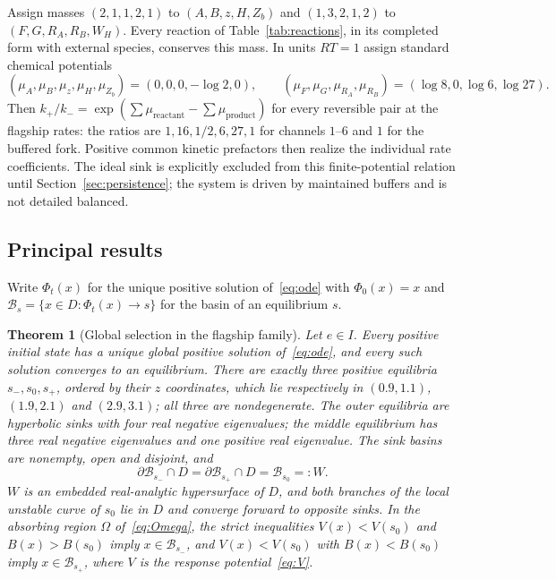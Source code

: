 \documentclass[11pt,a4paper]{article}
\theoremstyle{plain}
\newtheorem{theorem}{Theorem}[section]
\theoremstyle{definition}
\theoremstyle{remark}
\newcommand{\B}{\mathcal{B}}
\begin{document}
Assign masses $(2,1,1,2,1)$ to $(A,B,z,H,Z_b)$ and $(1,3,2,1,2)$ to $(F,G,R_A,R_B,W_H)$. Every reaction of Table~\ref{tab:reactions}, in its completed form with external species, conserves this mass. In units $RT=1$ assign standard chemical potentials
\begin{equation}\label{eq:mu}
(\mu_A,\mu_B,\mu_z,\mu_H,\mu_{Z_b})=(0,0,0,-\log2,0),\qquad(\mu_F,\mu_G,\mu_{R_A},\mu_{R_B})=(\log8,0,\log6,\log27).
\end{equation}
Then $k_+/k_-=\exp(\sum\mu_{\mathrm{reactant}}-\sum\mu_{\mathrm{product}})$ for every reversible pair at the flagship rates: the ratios are $1,16,1/2,6,27,1$ for channels $1$--$6$ and $1$ for the buffered fork. Positive common kinetic prefactors then realize the individual rate coefficients. The ideal sink is explicitly excluded from this finite-potential relation until Section~\ref{sec:persistence}; the system is driven by maintained buffers and is not detailed balanced.

\subsection{Principal results}\label{sec:results}

Write $\Phi_t(x)$ for the unique positive solution of~\eqref{eq:ode} with $\Phi_0(x)=x$ and $\B_s=\{x\in D:\Phi_t(x)\to s\}$ for the basin of an equilibrium $s$.

\begin{theorem}[Global selection in the flagship family]\label{thm:G}
Let $e\in I$. Every positive initial state has a unique global positive solution of~\eqref{eq:ode}, and every such solution converges to an equilibrium. There are exactly three positive equilibria $s_-,s_0,s_+$, ordered by their $z$ coordinates, which lie respectively in $(0.9,1.1)$, $(1.9,2.1)$ and $(2.9,3.1)$; all three are nondegenerate. The outer equilibria are hyperbolic sinks with four real negative eigenvalues; the middle equilibrium has three real negative eigenvalues and one positive real eigenvalue. The sink basins are nonempty, open and disjoint, and
\begin{equation}\label{eq:boundary}
\partial\B_{s_-}\cap D=\partial\B_{s_+}\cap D=\B_{s_0}=:W .
\end{equation}
$W$ is an embedded real-analytic hypersurface of $D$, and both branches of the local unstable curve of $s_0$ lie in $D$ and converge forward to opposite sinks. In the absorbing region $\Omega$ of~\eqref{eq:Omega}, the strict inequalities $V(x)<V(s_0)$ and $B(x)>B(s_0)$ imply $x\in\B_{s_-}$, and $V(x)<V(s_0)$ with $B(x)<B(s_0)$ imply $x\in\B_{s_+}$, where $V$ is the response potential~\eqref{eq:V}.
\end{theorem}
\end{document}
